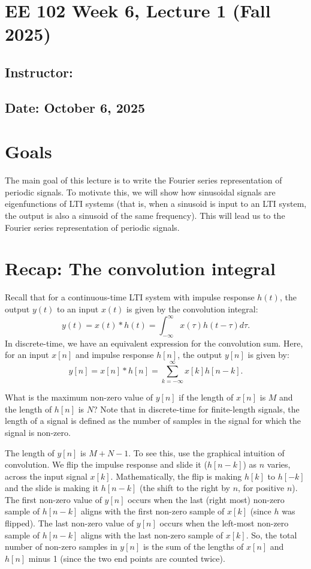 \documentclass{ee102_notes}
\renewcommand{\releasedate}{October 6, 2025}
\begin{document}
\section*{EE 102 Week 6, Lecture 1 (Fall 2025)}
\subsection*{Instructor: \instructor}
\subsection*{Date: \releasedate}

\section{Goals}
The main goal of this lecture is to write the Fourier series representation of periodic signals. To motivate this, we will show how sinusoidal signals are eigenfunctions of LTI systems (that is, when a sinusoid is input to an LTI system, the output is also a sinusoid of the same frequency). This will lead us to the Fourier series representation of periodic signals.

\section{Recap: The convolution integral}
Recall that for a continuous-time LTI system with impulse response \(h(t)\), the output \(y(t)\) to an input \(x(t)\) is given by the convolution integral:
\[
y(t) = x(t) * h(t) = \int_{-\infty}^{\infty} x(\tau) h(t - \tau) d\tau.
\]
In discrete-time, we have an equivalent expression for the convolution sum. Here, for an input $x[n]$ and impulse response \(h[n]\), the output \(y[n]\) is given by:
\[
y[n] = x[n] * h[n] = \sum_{k=-\infty}^{\infty} x[k] h[n - k].
\]
\begin{popquiz}
  What is the maximum non-zero value of \(y[n]\) if the length of \(x[n]\) is \(M\) and the length of \(h[n]\) is \(N\)? Note that in discrete-time for finite-length signals, the length of a signal is defined as the number of samples in the signal for which the signal is non-zero.

  \popqsplit
  The length of \(y[n]\) is \(M + N - 1\). To see this, use the graphical intuition of convolution. We flip the impulse response and slide it ($h[n-k]$) as $n$ varies, across the input signal $x[k]$. Mathematically, the flip is making $h[k]$ to $h[-k]$ and the slide is making it $h[n-k]$ (the shift to the right by $n$, for positive $n$). The first non-zero value of $y[n]$ occurs when the last (right most) non-zero sample of $h[n-k]$ aligns with the first non-zero sample of $x[k]$ (since $h$ was flipped). The last non-zero value of $y[n]$ occurs when the left-most non-zero sample of $h[n-k]$ aligns with the last non-zero sample of $x[k]$. So, the total number of non-zero samples in $y[n]$ is the sum of the lengths of $x[n]$ and $h[n]$ minus 1 (since the two end points are counted twice).
\end{popquiz}
\end{document}

